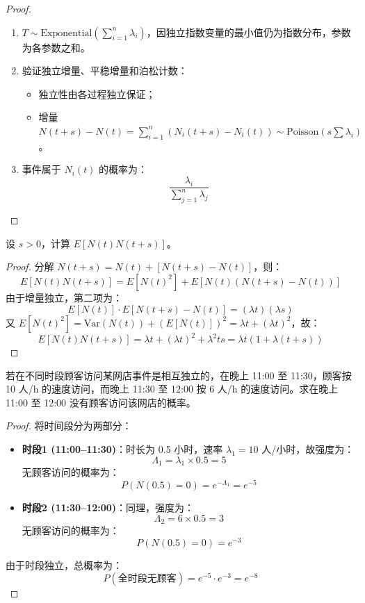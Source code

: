 \documentclass[lang=cn,10pt,thmcnt=section]{elegantbook}
\begin{document}
\begin{proof}
	\begin{enumerate}
		\item \( T \sim \text{Exponential}\left(\sum_{i=1}^{n} \lambda_i\right) \)，因独立指数变量的最小值仍为指数分布，参数为各参数之和。
		\item 验证独立增量、平稳增量和泊松计数：
		\begin{itemize}
			\item 独立性由各过程独立保证；
			\item 增量 \( N(t+s) - N(t) = \sum_{i=1}^{n} (N_i(t+s) - N_i(t)) \sim \text{Poisson}\left(s \sum \lambda_i\right) \)。
		\end{itemize}
		\item 事件属于 \( N_i(t) \) 的概率为：
		\[
		\frac{\lambda_i}{\sum_{j=1}^{n} \lambda_j}
		\]
	\end{enumerate}
\end{proof}
\begin{example}
	设 \( s > 0 \)，计算 \( E[N(t)N(t + s)] \)。
\end{example}
\begin{proof}
	分解 \( N(t+s) = N(t) + [N(t+s) - N(t)] \)，则：
\[
E[N(t)N(t+s)] = E[N(t)^2] + E[N(t)(N(t+s) - N(t))]
\]
由于增量独立，第二项为：
\[
E[N(t)] \cdot E[N(t+s) - N(t)] = (\lambda t)(\lambda s)
\]
又 \( E[N(t)^2] = \text{Var}(N(t)) + (E[N(t)])^2 = \lambda t + (\lambda t)^2 \)，故：
\[
E[N(t)N(t+s)] = \lambda t + (\lambda t)^2 + \lambda^2 t s = \lambda t (1 + \lambda (t + s))
\]
\end{proof}
\begin{example}
	若在不同时段顾客访问某网店事件是相互独立的，在晚上 11:00 至 11:30，顾客按 10 人/h 的速度访问，而晚上 11:30 至 12:00 按 6 人/h 的速度访问。求在晚上 11:00 至 12:00 没有顾客访问该网店的概率。
\end{example}
\begin{proof}
	
将时间段分为两部分：
\begin{itemize}
  \item \textbf{时段1 (11:00--11:30)}：时长为 0.5 小时，速率 $\lambda_1 = 10$ 人/小时，故强度为：
    \[
    \Lambda_1 = \lambda_1 \times 0.5 = 5
    \]
    无顾客访问的概率为：
    \[
    P(N(0.5) = 0) = e^{-\Lambda_1} = e^{-5}
    \]
  
  \item \textbf{时段2 (11:30--12:00)}：同理，强度为：
    \[
    \Lambda_2 = 6 \times 0.5 = 3
    \]
    无顾客访问的概率为：
    \[
    P(N(0.5) = 0) = e^{-3}
    \]
\end{itemize}

由于时段独立，总概率为：
\[
P(\text{全时段无顾客}) = e^{-5} \cdot e^{-3} = e^{-8}
\]

\end{proof}
\end{document}
